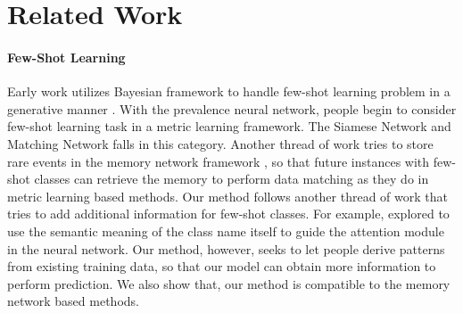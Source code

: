 \section{Related Work}
\paragraph{Few-Shot Learning}
Early work utilizes Bayesian framework to handle few-shot learning problem in a generative manner \cite{fei2006one}. With the prevalence neural network, people begin to consider few-shot learning task in a metric learning framework. The Siamese Network \cite{koch2015siamese} and Matching Network \cite{vinyals2016matching} falls in this category. Another thread of work tries to store rare events in the memory network framework \cite{santoro2016meta, kaiser2017learning}, so that future instances with few-shot classes can retrieve the memory to perform data matching as they do in metric learning based methods.
Our method follows another thread of work that tries to add additional information for few-shot classes. For example, \cite{wang2017multi} explored to use the semantic meaning of the class name itself to guide the attention module in the neural network. Our method, however, seeks to let people derive \RE patterns from existing training data, so that our model can obtain more information to perform prediction. We also show that, our method is compatible to the memory network based methods.


